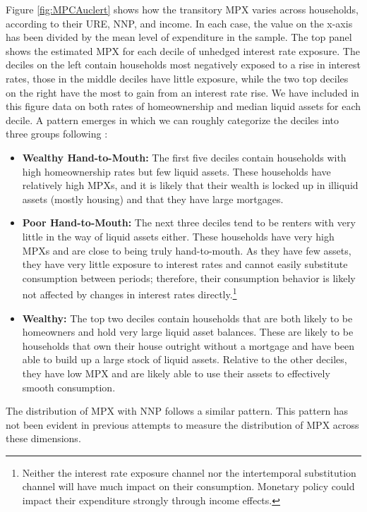 \documentclass[titlepage]{\econtex}\newcommand{\texname}{ConsumptionHeterogeneity}
\begin{document}
	Figure \ref{fig:MPCAuclert} shows how the transitory MPX varies across households, according to their URE, NNP, and income. In each case, the value on the x-axis has been divided by the mean level of expenditure in the sample. The top panel shows the estimated MPX for each decile of unhedged interest rate exposure. The deciles on the left contain households most negatively exposed to a rise in interest rates, those in the middle deciles have little exposure, while the two top deciles on the right have the most to gain from an interest rate rise. We have included in this figure data on both rates of homeownership and median liquid assets for each decile. A pattern emerges in which we can roughly categorize the deciles into three groups following \cite{violante_wealthy_2014}:
	\begin{itemize}
		\item \textbf{Wealthy Hand-to-Mouth:} The first five deciles contain households with high homeownership rates but few liquid assets. These households have relatively high MPXs, and it is likely that their wealth is locked up in illiquid assets (mostly housing) and that they have large mortgages.
		\item \textbf{Poor Hand-to-Mouth:} The next three deciles tend to be renters with very little in the way of liquid assets either. These households have very high MPXs and are close to being truly hand-to-mouth. As they have few assets, they have very little exposure to interest rates and cannot easily substitute consumption between periods; therefore, their consumption behavior is likely not affected by changes in interest rates directly.\footnote{Neither the interest rate exposure channel nor the intertemporal substitution channel will have much impact on their consumption. Monetary policy could impact their expenditure strongly through income effects.}
		\item \textbf{Wealthy:} The top two deciles contain households that are both likely to be homeowners and hold very large liquid asset balances. These are likely to be households that own their house outright without a mortgage and have been able to build up a large stock of liquid assets. Relative to the other deciles, they have low MPX and are likely able to use their assets to effectively smooth consumption.
	\end{itemize}

	The distribution of MPX with NNP follows a similar pattern. This pattern has not been evident in previous attempts to measure the distribution of MPX across these dimensions. 
\end{document}
